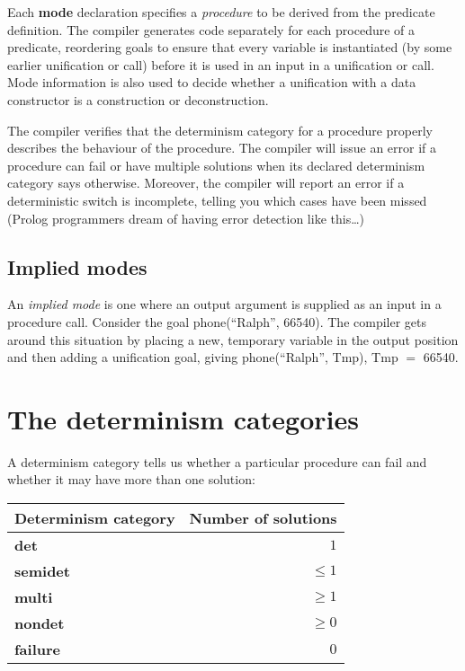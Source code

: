 \documentclass[a4paper,11pt,notitlepage,onecolumn]{book}
\begin{document}
\Note Each \textsf{\textbf{mode}} declaration specifies a \emph{procedure} to be derived
from the predicate definition.  The compiler generates code separately for
each procedure of a predicate, reordering goals to ensure that every
variable is instantiated (\eg by some earlier unification or call) before it
is used in an input in a unification or call.  Mode information is also used
to decide whether a unification with a data constructor is a construction or
deconstruction.

The compiler verifies that the determinism category for a procedure
properly describes the behaviour of the procedure.  The compiler will
issue an error if a procedure can fail or have multiple solutions when its
declared determinism category says otherwise.  Moreover, the compiler will
report an error if a deterministic switch is incomplete, telling you
which cases have been missed (Prolog programmers dream of having error
detection like this\ldots)

\subsection*{Implied modes}

An \emph{implied mode} is one where an output argument is supplied as
an input in a procedure call.  Consider the goal \textsf{phone(``Ralph'', 66540)}.
The compiler gets around this situation by placing a new, temporary variable
in the output position and then adding a unification goal, giving
\textsf{phone(``Ralph'', Tmp), Tmp {\ensuremath{=}} 66540}.

\section{The determinism categories}

A determinism category tells us whether a particular procedure can fail and
whether it may have more than one solution:

\begin{tabular}{lr}
Determinism category    & Number of solutions \\
\hline
\textsf{\textbf{det}}                   & $1$ \\
\textsf{\textbf{semidet}}               & $\leq 1$ \\
\textsf{\textbf{multi}}                 & $\geq 1$ \\
\textsf{\textbf{nondet}}                & $\geq 0$ \\
\textsf{\textbf{failure}}               & $0$ \\
\end{tabular}
\end{document}
